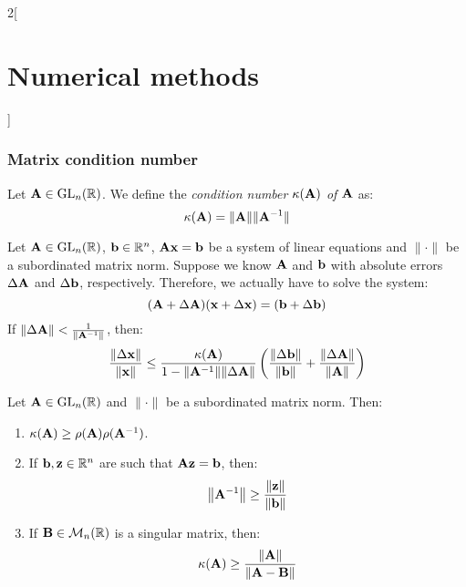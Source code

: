 \documentclass[../../../main.tex]{subfiles}
\begin{document}
\begin{multicols}{2}[\section{Numerical methods}]
\subsubsection*{Matrix condition number}
\begin{definition}
    Let $\vb{A}\in\mathrm{GL}_n(\mathbb{R})$. We define the \textit{condition number $\kappa(\vb{A})$ of $\vb{A}$} as: $$\kappa(\vb{A})=\|\vb{A}\|\|\vb{A}^{-1}\|$$
\end{definition}
\begin{theorem}
    Let $\vb{A}\in\mathrm{GL}_n(\mathbb{R})$, $\vb{b}\in\mathbb{R}^n$, $\vb{A}\vb{x}=\vb{b}$ be a system of linear equations and $\|\cdot\|$ be a subordinated matrix norm. Suppose we know $\vb{A}$ and $\vb{b}$ with absolute errors $\Delta\vb{A}$ and $\Delta\vb{b}$, respectively. Therefore, we actually have to solve the system: $$(\vb{A}+\Delta\vb{A})(\vb{x}+\Delta \vb{x})=(\vb{b}+\Delta\vb{b})$$ If $\|\Delta\vb{A}\|<\frac{1}{\|\vb{A}^{-1}\|}$, then: $$\frac{\|\Delta \vb{x}\|}{\|\vb{x}\|}\leq\frac{\kappa(\vb{A})}{1-\norm{\vb{A}^{-1}}\norm{\Delta\vb{A}}}\left(\frac{\norm{\Delta\vb{b}}}{\norm{\vb{b}}}+\frac{\norm{\Delta\vb{A}}}{\norm{\vb{A}}}\right)$$
\end{theorem}
\begin{theorem}
    Let $\vb{A}\in\mathrm{GL}_n(\mathbb{R})$ and $\|\cdot\|$ be a subordinated matrix norm. Then:
    \begin{enumerate}
        \item $\kappa(\vb{A})\geq\rho(\vb{A})\rho(\vb{A}^{-1})$.
        \item If $\vb{b},\vb{z}\in\mathbb{R}^n$ are such that $\vb{A}\vb{z}=\vb{b}$, then: $$\norm{\vb{A}^{-1}}\geq\frac{\norm{\vb{z}}}{\norm{\vb{b}}}$$
        \item If $\vb{B}\in\mathcal{M}_n(\mathbb{R})$ is a singular matrix, then: $$\kappa(\vb{A})\geq\frac{\norm{\vb{A}}}{\norm{\vb{A}-\vb{B}}}$$
    \end{enumerate}
\end{theorem}

\end{multicols}
\end{document}
